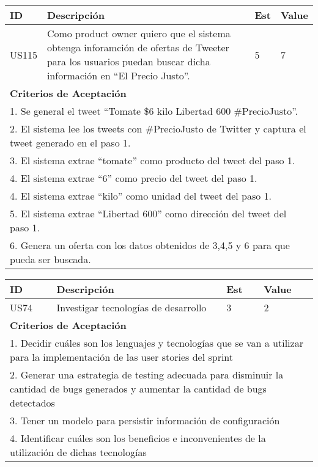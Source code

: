 \bigskip
\begin{tabular}{|p{1cm}|p{10cm}|p{1cm}|p{1cm}|}
\hline
\hline
\textbf{ID}&\textbf{Descripción}&\textbf{Est}&\textbf{Value}\\
\hline
\hline
US115&Como product owner quiero que el sistema obtenga inforamción de ofertas de Tweeter para los usuarios puedan buscar dicha información en ``El Precio Justo''.&5&7\\
\hline
\hline
\multicolumn{4}{|p{13cm}|}{ \textbf{Criterios de Aceptación}} \\
\hline
\hline
\multicolumn{4}{|p{13cm}|}{1. Se general el tweet ``Tomate \$6 kilo Libertad 600 $\#$PrecioJusto''.}\\
\multicolumn{4}{|p{13cm}|}{2. El sistema lee los tweets con $\#$PrecioJusto de Twitter y captura el tweet generado en el paso 1.}\\
\multicolumn{4}{|p{13cm}|}{3. El sistema extrae ``tomate'' como producto del tweet del paso 1.}\\
\multicolumn{4}{|p{13cm}|}{4. El sistema extrae ``6'' como precio del tweet del paso 1.}\\
\multicolumn{4}{|p{13cm}|}{4. El sistema extrae ``kilo'' como unidad del tweet del paso 1.}\\
\multicolumn{4}{|p{13cm}|}{5. El sistema extrae ``Libertad 600'' como dirección del tweet del paso 1.}\\
\multicolumn{4}{|p{13cm}|}{6. Genera un oferta con los datos obtenidos de 3,4,5 y 6 para que pueda ser buscada.}\\
\hline
\hline
\end{tabular}


\bigskip
\begin{tabular}{|p{1cm}|p{10cm}|p{1cm}|p{1cm}|}
\hline
\hline
\textbf{ID}&\textbf{Descripción}&\textbf{Est}&\textbf{Value}\\
\hline
\hline
US74&Investigar tecnologías de desarrollo&3&2\\
\hline
\hline
\multicolumn{4}{|p{13cm}|}{ \textbf{Criterios de Aceptación}} \\
\hline
\hline
\multicolumn{4}{|p{13cm}|}{1. Decidir cuáles son los lenguajes y tecnologías que se van a utilizar para la implementación de las user stories del sprint}\\
\multicolumn{4}{|p{13cm}|}{2. Generar una estrategia de testing adecuada para disminuir la cantidad de bugs generados y aumentar la cantidad de bugs detectados}\\
\multicolumn{4}{|p{13cm}|}{3. Tener un modelo para persistir información de configuración}\\
\multicolumn{4}{|p{13cm}|}{4. Identificar cuáles son los beneficios e inconvenientes de la utilización de dichas tecnologías}\\
\hline
\hline
\end{tabular}

